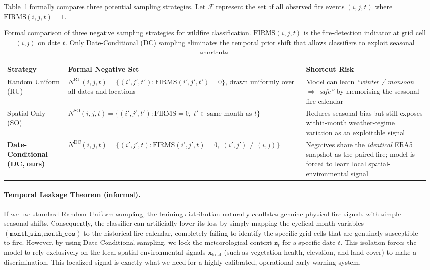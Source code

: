 \documentclass[11pt]{article}
\begin{document}
Table~\ref{tab:sampling_strategies} formally compares three potential sampling strategies. Let $\mathcal{F}$ represent the set of all observed fire events $(i,j,t)$ where $\text{FIRMS}(i,j,t)=1$.

\begin{table}[H]
\centering
\setlength{\tabcolsep}{5pt}
\renewcommand{\arraystretch}{1.35}
\begin{tabular}{p{3.2cm}p{6.2cm}p{4.5cm}}
\toprule
\textbf{Strategy} & \textbf{Formal Negative Set} & \textbf{Shortcut Risk} \\
\midrule
Random Uniform (RU) &
  $N^{\text{RU}}(i,j,t) = \{(i',j',t') : \text{FIRMS}(i',j',t')=0\}$,
  drawn uniformly over all dates and locations &
  Model can learn \textit{``winter / monsoon $\Rightarrow$ safe''} by
  memorising the seasonal fire calendar \\
\midrule
Spatial-Only (SO) &
  $N^{\text{SO}}(i,j,t) = \{(i',j',t') : \text{FIRMS}=0,\;t'\in\text{same month as }t\}$ &
  Reduces seasonal bias but still exposes within-month weather-regime variation
  as an exploitable signal \\
\midrule
\textbf{Date-Conditional (DC, ours)} &
  $N^{\text{DC}}(i,j,t) = \{(i',j',t) : \text{FIRMS}(i',j',t)=0,\;(i',j')\neq(i,j)\}$ &
  Negatives share the \textit{identical} ERA5 snapshot as the paired fire;
  model is forced to learn local spatial-environmental signal \\
\bottomrule
\end{tabular}
\caption{Formal comparison of three negative sampling strategies for wildfire classification.
  $\text{FIRMS}(i,j,t)$ is the fire-detection indicator at grid cell $(i,j)$ on date $t$.
  Only Date-Conditional (DC) sampling eliminates the temporal prior shift that allows
  classifiers to exploit seasonal shortcuts.}
\label{tab:sampling_strategies}
\end{table}

\medskip
\paragraph{Temporal Leakage Theorem (informal).}
If we use standard Random-Uniform sampling, the training distribution naturally conflates genuine physical fire signals with simple seasonal shifts. Consequently, the classifier can artificially lower its loss by simply mapping the cyclical month variables $(\texttt{month\_sin},\texttt{month\_cos})$ to the historical fire calendar, completely failing to identify the specific grid cells that are genuinely susceptible to fire. However, by using Date-Conditional sampling, we lock the meteorological context $\mathbf{z}_t$ for a specific date $t$. This isolation forces the model to rely exclusively on the local spatial-environmental signals $\mathbf{x}_{\text{local}}$ (such as vegetation health, elevation, and land cover) to make a discrimination. This localized signal is exactly what we need for a highly calibrated, operational early-warning system.
\end{document}

